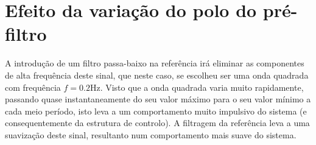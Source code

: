 \documentclass[%
  reprint,
  nofootinbib,
  amsmath,amssymb,
  aps,
  10pt,
  a4paper
]{revtex4-1}
\begin{document}
\section{Efeito da variação do polo do pré-filtro}

A introdução de um filtro passa-baixo na referência irá eliminar as componentes de alta frequência deste sinal, que neste caso, se escolheu ser uma onda quadrada com frequência $f=0.2$Hz. Visto que a onda quadrada varia muito rapidamente, passando quase instantaneamente do seu valor máximo para o seu valor mínimo a cada meio período, isto leva a um comportamento muito impulsivo do sistema (e consequentemente da estrutura de controlo). A filtragem da referência leva a uma suavização deste sinal, resultanto num comportamento mais suave do sistema.\\
\end{document}
